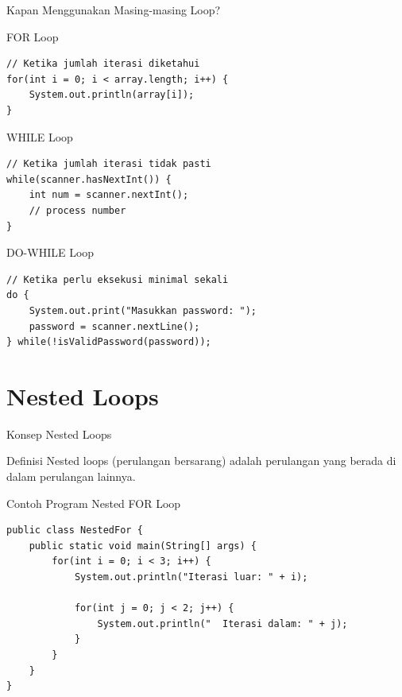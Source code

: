 \documentclass{beamer}
\begin{document}
\begin{frame}[fragile]{Kapan Menggunakan Masing-masing Loop?}
  \vspace{-0.2cm}
  \begin{block}{FOR Loop}
    \begin{lstlisting}[basicstyle=\ttfamily\tiny]
// Ketika jumlah iterasi diketahui
for(int i = 0; i < array.length; i++) {
    System.out.println(array[i]);
}
    \end{lstlisting}
  \end{block}

  \vspace{-0.5cm}
  \begin{block}{WHILE Loop}
    \begin{lstlisting}[basicstyle=\ttfamily\tiny]
// Ketika jumlah iterasi tidak pasti
while(scanner.hasNextInt()) {
    int num = scanner.nextInt();
    // process number
}
    \end{lstlisting}
  \end{block}

  \vspace{-0.5cm}
  \begin{block}{DO-WHILE Loop}
    \begin{lstlisting}[basicstyle=\ttfamily\tiny]
// Ketika perlu eksekusi minimal sekali
do {
    System.out.print("Masukkan password: ");
    password = scanner.nextLine();
} while(!isValidPassword(password));
    \end{lstlisting}
  \end{block}
\end{frame}

\section{Nested Loops}
\begin{frame}[fragile]{Konsep Nested Loops}
  \begin{block}{Definisi}
    Nested loops (perulangan bersarang) adalah perulangan yang berada di dalam perulangan lainnya.
  \end{block}
  
  \begin{exampleblock}{Contoh Program Nested FOR Loop}
    \begin{lstlisting}
public class NestedFor {
    public static void main(String[] args) {
        for(int i = 0; i < 3; i++) {
            System.out.println("Iterasi luar: " + i);
            
            for(int j = 0; j < 2; j++) {
                System.out.println("  Iterasi dalam: " + j);
            }
        }
    }
}
    \end{lstlisting}
  \end{exampleblock}
\end{frame}
\end{document}
